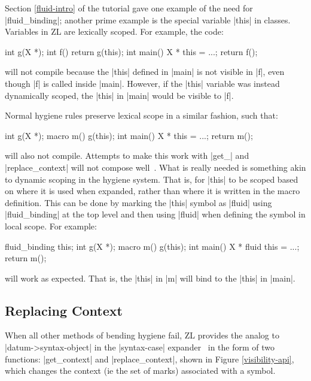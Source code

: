 Section \ref{fluid-intro} of the tutorial gave one example of the need
for |fluid_binding|; another prime example is the special variable
|this| in classes.  Variables in ZL are lexically scoped. For example,
the code:
\begin{code}
int g(X *);
int f() {return g(this);}
int main() {X * this = ...; return f();}
\end{code}
will not compile because the |this| defined in |main| is not visible
in |f|, even though |f| is called inside |main|. However, if the
|this| variable was instead dynamically scoped, the |this| in |main|
would be visible to |f|.
 
Normal hygiene rules preserve lexical scope in a similar fashion, such that:
\begin{code}
int g(X *);
macro m() {g(this);}
int main() {X * this = ...; return m();}
\end{code}
will also not compile.  Attempts to make this work with |get_| and
|replace_context| will not compose well~\cite{syn-parm}.  What
is really needed is something akin to dynamic scoping in the hygiene
system.  That is, for |this| to be scoped based on where it is used
when expanded, rather than where it is written in the macro
definition.  This can be done by marking the |this| symbol as |fluid|
using |fluid_binding| at the top level and then using |fluid| when
defining the symbol in local scope.  For example:
\begin{code}
fluid_binding this;
int g(X *);
macro m() {g(this);}
int main() {X * fluid this = ...; return m();}
\end{code}
will work as expected.  That is, the |this| in |m| will bind to the
|this| in |main|. 




\subsection{Replacing Context}
\label{replace_context}

When all other methods of bending hygiene fail, ZL provides the analog
to |datum->syntax-object| in the |syntax-case|
expander~\cite{syntax-case} in the form of two functions:
|get_context| and |replace_context|, shown in Figure
\ref{visibility-api}, which changes the context (ie the set of marks)
associated with a symbol.

